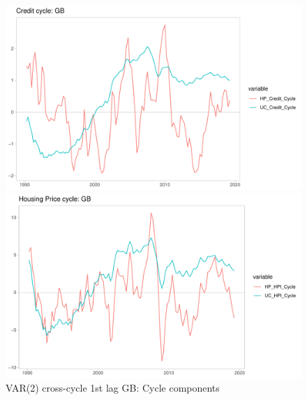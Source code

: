 \documentclass[fleqn]{article}
\begin{document}
\begin{outline}[enumerate]
		\begin{figure}[h!]
			\caption{VAR(2) cross-cycle 1st lag GB: Cycle components}	
			\centerline{\includegraphics[scale=0.7]{../../Regression/VAR_2_crosscycle_1stlagonly/Output/Graphs/Credit_cycle_GB.pdf}}
			\centerline{\includegraphics[scale=0.7]{../../Regression/VAR_2_crosscycle_1stlagonly/Output/Graphs/HP_Cycle_GB.pdf}}
		\end{figure}
		

\end{outline}
\end{document}
